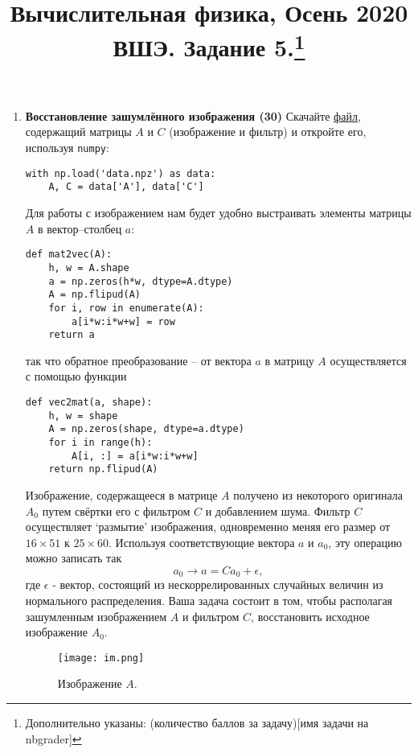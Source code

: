 \documentclass[prb,papersize=a4paper,notitlepage]{revtex4-1}%
\begin{document}
\title{Вычислительная физика, Осень 2020 ВШЭ. Задание 5.\footnote{Дополнительно указаны: (количество баллов за задачу)[имя задачи на nbgrader]}}
\maketitle
\begin{enumerate}
\item \textbf{Восстановление зашумлённого изображения (30)} Скачайте \href{https://www.dropbox.com/s/qgz1x67t10fd7hf/data.npz?dl=0}{файл}, содержащий матрицы $A$ и $C$ (изображение и фильтр) и откройте его, используя \lstinline{numpy}:
\lstset{language=Python}
\lstset{frame=lines}
\lstset{basicstyle=\ttfamily}
\begin{lstlisting}
with np.load('data.npz') as data:
    A, C = data['A'], data['C']
\end{lstlisting}
Для работы с изображением нам будет удобно выстраивать элементы матрицы $A$ в вектор--столбец $a$:
\lstset{language=Python}
\lstset{frame=lines}
\lstset{basicstyle=\ttfamily}
\begin{lstlisting}
def mat2vec(A):
    h, w = A.shape
    a = np.zeros(h*w, dtype=A.dtype)
    A = np.flipud(A) 
    for i, row in enumerate(A):
        a[i*w:i*w+w] = row
    return a
\end{lstlisting}
так что обратное преобразование -- от вектора $a$ в матрицу $A$ осуществляется с помощью функции
\lstset{language=Python}
\lstset{frame=lines}
\lstset{basicstyle=\ttfamily}
\begin{lstlisting}
def vec2mat(a, shape):
    h, w = shape
    A = np.zeros(shape, dtype=a.dtype)
    for i in range(h):
        A[i, :] = a[i*w:i*w+w]
    return np.flipud(A)
\end{lstlisting}
Изображение, содержащееся в матрице $A$ получено из некоторого оригинала $A_0$ путем свёртки его с фильтром $C$ и добавлением шума. Фильтр $C$ осуществляет `размытие' изображения, одновременно меняя его размер от $16\times 51$ к $25\times 60$. Используя соответствующие вектора $a$ и $a_0$, эту операцию можно записать так
$$
a_0\to a = C a_0 + \epsilon,
$$
где $\epsilon$ - вектор, состоящий из нескоррелированных случайных величин из нормального распределения. Ваша задача состоит в том, чтобы располагая зашумленным изображением $A$ и фильтром $C$, восстановить исходное изображение $A_0$.
\begin{figure}[h!]
\texttt{[image: im.png]}
\caption{Изображение $A$.}

\end{figure}
\end{enumerate}
\end{document}
